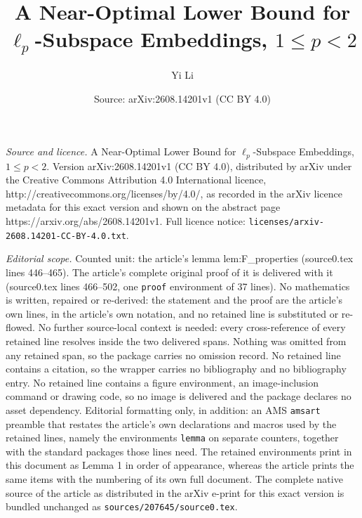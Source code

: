 \documentclass[10pt,a4paper]{amsart}
\title{A Near-Optimal Lower Bound for $\ell_p$-Subspace Embeddings, $1\leq p<2$}
\author{Yi Li}
\date{Source: arXiv:2608.14201v1 (CC BY 4.0)}
\begin{document}
\maketitle

\noindent\emph{Source and licence.} A Near-Optimal Lower Bound for $\ell_p$-Subspace Embeddings, $1\leq p<2$. Version arXiv:2608.14201v1 (CC BY 4.0), distributed by arXiv under the Creative Commons Attribution 4.0 International licence, http://creativecommons.org/licenses/by/4.0/, as recorded in the arXiv licence metadata for this exact version and shown on the abstract page https://arxiv.org/abs/2608.14201v1. Full licence notice: \texttt{licenses/arxiv-2608.14201-CC-BY-4.0.txt}.\par\smallskip

\noindent\textit{Editorial scope.} Counted unit: the article's lemma lem:F\_properties (source0.tex lines 446--465). The article's complete original proof of it is delivered with it (source0.tex lines 466--502, one \texttt{proof} environment of 37 lines). No mathematics is written, repaired or re-derived: the statement and the proof are the article's own lines, in the article's own notation, and no retained line is substituted or re-flowed.  No further source-local context is needed: every cross-reference of every retained line resolves inside the two delivered spans.  Nothing was omitted from any retained span, so the package carries no omission record.  No retained line contains a citation, so the wrapper carries no bibliography and no bibliography entry.  No retained line contains a figure environment, an image-inclusion command or drawing code, so no image is delivered and the package declares no asset dependency.  Editorial formatting only, in addition: an AMS \texttt{amsart} preamble that restates the article's own declarations and macros used by the retained lines, namely the environments \texttt{lemma} on separate counters, together with the standard packages those lines need.  The retained environments print in this document as Lemma 1 in order of appearance, whereas the article prints the same items with the numbering of its own full document.  The complete native source of the article as distributed in the arXiv e-print for this exact version is bundled unchanged as \texttt{sources/207645/source0.tex}.
\end{document}

